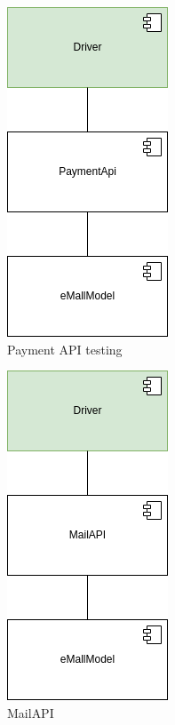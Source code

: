\begin{figure}[H]
    \centering
    \includegraphics[keepaspectratio]{Testing/emall/payment.png}
    \caption{Payment \ac{API} testing}
\end{figure}
\begin{figure}[H]
    \centering
    \includegraphics[keepaspectratio]{Testing/emall/mail.png}
    \caption{Mail\ac{API}}
\end{figure}
